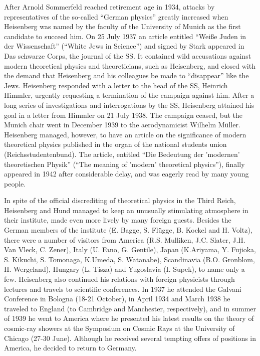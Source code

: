 \documentclass{article}
\begin{document}
After Arnold Sommerfeld reached retirement age in 1934, attacks by representatives of the so-called “German physics” greatly increased when Heisenberg was named by the faculty of the University of Munich as the first candidate to succeed him. On 25 July 1937 an article entitled “Weiße Juden in der Wissenschaft” (“White Jews in Science”) and signed by Stark appeared in Das schwarze Corps, the journal of the SS. It contained wild accusations against modern theoretical physics and theoreticians, such as Heisenberg, and closed with the demand that Heisenberg and his colleagues be made to “disappear” like the Jews. Heisenberg responded with a letter to the head of the SS, Heinrich Himmler, urgently requesting a termination of the campaign against him. After a long series of investigations and interrogations by the SS, Heisenberg attained his goal in a letter from Himmler on 21 July 1938. The campaign ceased, but the Munich chair went in December 1939 to the aerodynamicist Wilhelm Müller. Heisenberg managed, however, to have an article on the significance of modern theoretical physics published in the organ of the national students union (Reichsstudentenbund). The article, entitled “Die Bedeutung der 'modernen' theoretischen Physik” (“The meaning of 'modern' theoretical physics”), finally appeared in 1942 after considerable delay, and was eagerly read by many young people.

In spite of the official discrediting of theoretical physics in the Third Reich, Heisenberg and Hund managed to keep an unusually stimulating atmosphere in their institute, made even more lively by many foreign guests. Besides the German members of the institute (E. Bagge, S. Flügge, B. Kockel and H. Voltz), there were a number of visitors from America (R.S. Mulliken, J.C. Slater, J.H. Van Vleck, C. Zener), Italy (U. Fano, G. Gentile), Japan (K.Ariyama, Y. Fujioka, S. Kikuchi, S. Tomonaga, K.Umeda, S. Watanabe), Scandinavia (B.O. Gronblom, H. Wergeland), Hungary (L. Tisza) and Yugoslavia (I. Supek), to name only a few. Heisenberg also continued his relations with foreign physicists through lectures and travels to scientific conferences. In 1937 he attended the Galvani Conference in Bologna (18-21 October), in April 1934 and March 1938 he traveled to England (to Cambridge and Manchester, respectively), and in summer of 1939 he went to America where he presented his latest results on the theory of cosmic-ray showers at the Symposium on Cosmic Rays at the University of Chicago (27-30 June). Although he received several tempting offers of positions in America, he decided to return to Germany.
\end{document}
